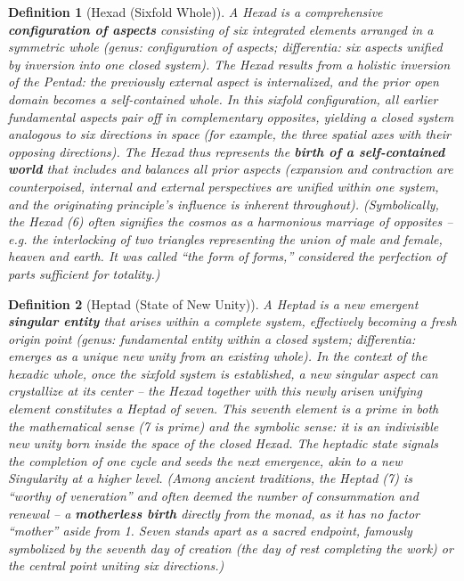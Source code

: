 \documentclass[11pt]{article}
\newtheorem{definition}{Definition}
\theoremstyle{plain}
\begin{document}
\begin{definition}[Hexad (Sixfold Whole)]
A \emph{Hexad} is a comprehensive \textbf{configuration of aspects} consisting of six integrated elements arranged in a symmetric whole \textit{(genus: configuration of aspects; differentia: six aspects unified by inversion into one closed system)}. The Hexad results from a holistic \textit{inversion} of the Pentad: the previously external aspect is internalized, and the prior open domain becomes a self-contained whole. In this sixfold configuration, all earlier fundamental aspects pair off in complementary opposites, yielding a closed system analogous to six directions in space (for example, the three spatial axes with their opposing directions). The Hexad thus represents the \textbf{birth of a self-contained world} that includes and balances all prior aspects (expansion and contraction are counterpoised, internal and external perspectives are unified within one system, and the originating principle’s influence is inherent throughout). \textit{(Symbolically, the Hexad (6) often signifies the cosmos as a harmonious marriage of opposites – e.g. the interlocking of two triangles representing the union of male and female, heaven and earth. It was called “the form of forms,” considered the perfection of parts sufficient for totality.)}
\end{definition}

\begin{definition}[Heptad (State of New Unity)]
A \emph{Heptad} is a new emergent \textbf{singular entity} that arises \textit{within} a complete system, effectively becoming a fresh origin point \textit{(genus: fundamental entity within a closed system; differentia: emerges as a unique new unity from an existing whole)}. In the context of the hexadic whole, once the sixfold system is established, a new singular aspect can crystallize at its center – the Hexad together with this newly arisen unifying element constitutes a Heptad of seven. This seventh element is a \textit{prime} in both the mathematical sense (7 is prime) and the symbolic sense: it is an indivisible new unity born \textit{inside} the space of the closed Hexad. The heptadic state signals the completion of one cycle and seeds the next emergence, akin to a new Singularity at a higher level. \textit{(Among ancient traditions, the Heptad (7) is “worthy of veneration” and often deemed the number of consummation and renewal – a \textbf{motherless birth} directly from the monad, as it has no factor “mother” aside from 1. Seven stands apart as a sacred endpoint, famously symbolized by the seventh day of creation (the day of rest completing the work) or the central point uniting six directions.)}
\end{definition}
\end{document}
